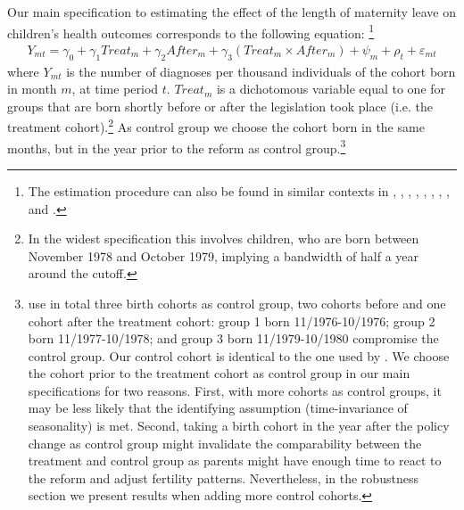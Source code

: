 \documentclass[11pt, a4paper]{article} %
\begin{document}
Our main specification to estimating the effect of the length of maternity leave on children's health outcomes corresponds to the following equation: \footnote{The estimation procedure can also be found in similar contexts in \cite{RafaelLaliveandJosefZweimuller2009}, \cite{Dustmann2012}, \cite{Ekberg2013parental}, \cite{schonberg2014expansions}, \cite{Lalive2014}, \cite{Huebener2017}, \cite{danzer2017}, \cite{guertzgen2018}, and \cite{avdic2018modern}.}
\begin{align}
Y_{mt} = \gamma_0 + \gamma_1 Treat_{m} + \gamma_2 After_{m} + \gamma_3 (Treat_{m} \times After_{m}) + \psi_m + \rho_t + \varepsilon_{mt} \label{eq:DD_basline}
\end{align}
where $Y_{mt}$ is the number of diagnoses per thousand individuals of the cohort born in month $m$, at time period $t$. $Treat_{m}$ is a dichotomous variable equal to one for groups that are born shortly before or after the legislation took place (i.e. the treatment cohort).\footnote{In the widest specification this involves children, who are born between November 1978 and October 1979, implying a bandwidth of half a year around the cutoff.} As control group we choose the cohort born in the same months, but in the year prior to the reform as control group.\footnote{\cite{Dustmann2012} use in total three birth cohorts as control group, two cohorts before and one cohort after the treatment cohort: group 1 born 11/1976-10/1976; group 2 born 11/1977-10/1978; and group 3 born 11/1979-10/1980 compromise the control group. Our control cohort is identical to the one used by \cite{guertzgen2018}. \newline We choose the cohort prior to the treatment cohort as control group in our main specifications for two reasons. First, with more cohorts as control groups, it may be less likely that the identifying assumption (time-invariance of seasonality) is met. Second, taking a birth cohort in the year after the policy change as control group might invalidate the comparability between the treatment and control group as parents might have enough time to react to the reform and adjust fertility patterns. Nevertheless, in the robustness section we present results when adding more control cohorts.}
\end{document}
